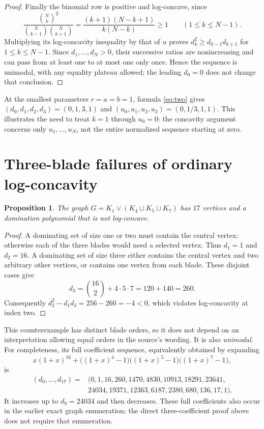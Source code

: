 \documentclass[11pt,a4paper]{article}
\newtheorem{proposition}{Proposition}
\begin{document}
\begin{proof}
Finally the binomial row is positive and log-concave, since
\[
 \frac{\binom Nk^2}{\binom N{k-1}\binom N{k+1}}
 =\frac{(k+1)(N-k+1)}{k(N-k)}\ge1\qquad(1\le k\le N-1).
\]
Multiplying
its log-concavity inequality by that of $u$ proves
$d_k^2\ge d_{k-1}d_{k+1}$ for $1\le k\le N-1$.
Since $d_1,\ldots,d_N>0$, their successive ratios are nonincreasing
and can pass from at least one to at most one only once. Hence
the sequence is unimodal, with any equality plateau allowed;
the leading $d_0=0$ does not change that conclusion.
\end{proof}

At the smallest parameters $r=a=b=1$, formula \eqref{eq:two} gives
$(d_0,d_1,d_2,d_3)=(0,1,3,1)$ and
$(u_0,u_1,u_2,u_3)=(0,1/3,1,1)$. This illustrates the need to
treat $k=1$ through $u_0=0$: the concavity argument concerns only
$u_1,\ldots,u_N$, not the entire normalized sequence starting at zero.

\section{Three-blade failures of ordinary log-concavity}
\begin{proposition}\label{prop:17}
The graph $G=K_1\vee(K_4\sqcup K_5\sqcup K_7)$ has $17$ vertices
and a domination polynomial that is not log-concave.
\end{proposition}
\begin{proof}
A dominating set of size one or two must contain the central vertex:
otherwise each of the three blades would need a selected vertex.
Thus $d_1=1$ and $d_2=16$. A dominating set of size three either
contains the central vertex and two arbitrary other vertices, or
contains one vertex from each blade. These disjoint cases give
\[
 d_3=\binom{16}{2}+4\cdot5\cdot7=120+140=260.
\]
Consequently $d_2^2-d_1d_3=256-260=-4<0$, which violates
log-concavity at index two.
\end{proof}

This counterexample has distinct blade orders, so it does not
depend on an interpretation allowing equal orders in the source's
wording. It is also \emph{unimodal}. For completeness, its full
coefficient sequence, equivalently obtained by expanding
\[
 x(1+x)^{16}+
 \bigl((1+x)^4-1\bigr)\bigl((1+x)^5-1\bigr)\bigl((1+x)^7-1\bigr),
\]
is
\begin{align*}
 (d_0,\ldots,d_{17})={}&(0,1,16,260,1470,4830,10913,18291,23641,\\
                     &24034,19371,12363,6187,2380,680,136,17,1).
\end{align*}
It increases up to $d_9=24034$ and then decreases. These full
coefficients also occur in the earlier exact graph enumeration;
the direct three-coefficient proof above does not require that
enumeration.
\end{document}
